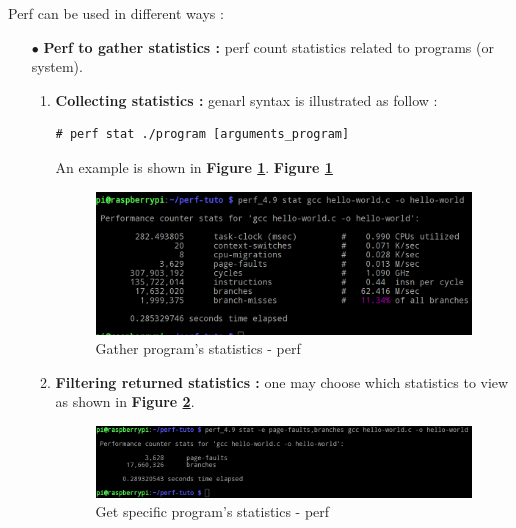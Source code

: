 \vspace{20px}
Perf can be used in different ways :
\begin{itemize}
	\item[$\bullet$] \textbf{Perf to gather statistics : } perf count statistics related to programs (or system).
	
		\begin{enumerate}
			\item \textbf{Collecting statistics : } genarl syntax is illustrated as follow :
	\begin{lstlisting}[style=BashInputStyle]
# perf stat ./program [arguments_program]
	\end{lstlisting}		
An example is shown in \textbf{Figure \ref{Gather program's statistics - perf}}.
\textbf{Figure \ref{Gather program's statistics - perf}}
					\begin{figure}[H]
						\centering
        				\includegraphics[scale=0.25]{img/solution/basic-statistics-using-perf.png}
        				\caption{Gather program's statistics - perf}
        				\label{Gather program's statistics - perf}
    				\end{figure}		
			
			
			\item \textbf{Filtering returned statistics : } one may choose which statistics to view as shown in \textbf{Figure \ref{Get specific program's statistics - perf}}.
					\begin{figure}[H]
						\centering
        				\includegraphics[scale=0.25]{img/solution/filter-statistics-using-perf.png}
        				\caption{Get specific program's statistics - perf}
        				\label{Get specific program's statistics - perf}
    				\end{figure}



\end{enumerate}
\end{itemize}
